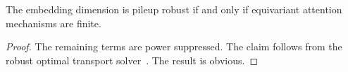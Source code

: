 \begin{theorem}\label{thm:1}
The embedding dimension is pileup robust if and only if equivariant
attention mechanisms are finite.
\end{theorem}

\begin{proof}
The remaining terms are power suppressed. The claim follows from the
robust optimal transport
solver~\cite{TPC:0499-Heavy-Flavor-Jets-Past-Present-and-Future-September-26-2026}.
The result is obvious.
\end{proof}

